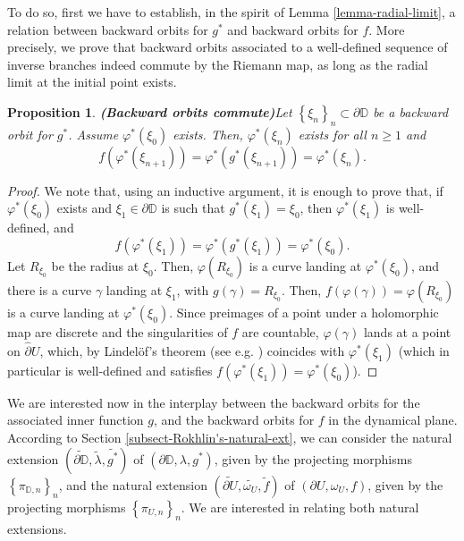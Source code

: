 \documentclass[11pt]{article}
\newtheorem{prop}[thm]{Proposition}
\theoremstyle{definition}
\theoremstyle{remark}
\theoremstyle{plain}
\begin{document}
To do so, first we have to establish, in the spirit of Lemma \ref{lemma-radial-limit}, a relation between backward orbits for $ g^* $ and backward orbits for $ f $. More precisely, we prove that backward orbits associated to a well-defined sequence of inverse branches indeed commute by the Riemann map, as long as the radial limit at the initial point exists.
\begin{prop}{\bf (Backward orbits commute)}\label{prop-backwards-orbits-commute}
	Let $ \left\lbrace \xi_n\right\rbrace _n\subset\partial\mathbb{D} $ be a backward orbit for $ g^* $. Assume $ \varphi^*(\xi_0 )$ exists. Then, $ \varphi^*(\xi_n) $ exists for all $ n\geq 1 $ and \[f(\varphi^*(\xi_{n+1}))=\varphi^*(g^*(\xi_{n+1}))=\varphi^*(\xi_{n}).\]
\end{prop}
\begin{proof}
	We note that, using an inductive argument, it is enough to prove that, if 	$ \varphi^*(\xi_0 )$ exists and $ \xi_1\in\partial\mathbb{D} $ is such that $ g^*(\xi_1)=\xi_0 $, then $ \varphi^*(\xi_1) $ is well-defined, and \[f(\varphi^*(\xi_{1}))=\varphi^*(g^*(\xi_{1}))=\varphi^*(\xi_{0}).\] Let $ R_{\xi_0} $ be the radius at $ \xi_0$. Then, $\varphi (R_{\xi_0}) $ is a curve landing  at $ \varphi^*(\xi_0) $, and there is a curve $ \gamma $ landing at $ \xi_1 $, with $ g(\gamma)= R_{\xi_0}$. Then, $ f(\varphi (\gamma))=\varphi(R_{\xi_0}) $ is a curve landing at  $ \varphi^*(\xi_0 )$. Since preimages of a point under a holomorphic map are discrete and the singularities of $ f $ are countable, $ \varphi (\gamma) $ lands at a point on $ \widehat{\partial} U $, which, by Lindelöf's theorem (see e.g. \cite[Thm. 2.2]{CarlesonGamelin}) coincides with $ \varphi^*(\xi_1) $ (which in particular is well-defined and satisfies $ f(\varphi^*(\xi_{1}))=\varphi^*(\xi_{0}) $).
\end{proof}







We are interested now in the interplay between the backward orbits for the associated inner function $ g $, and the backward orbits for $ f $ in the dynamical plane. 
According to Section \ref{subsect-Rokhlin's-natural-ext}, we can consider the natural extension $ (\widetilde{\partial\mathbb{D}}, \widetilde{\lambda}, \widetilde{g^*}) $ of $ (\partial\mathbb{D},  \lambda, g^*) $, given by the projecting morphisms $ \left\lbrace \pi_{\mathbb{D},n}\right\rbrace _n $, and the natural extension $ (\widetilde{\partial U}, \widetilde{\omega_U}, \widetilde{f}) $ of $ 	(\partial U,  \omega_U, f) $, given by the projecting morphisms $ \left\lbrace \pi_{U,n}\right\rbrace _n $. 
We are interested in relating both natural extensions.
\end{document}
